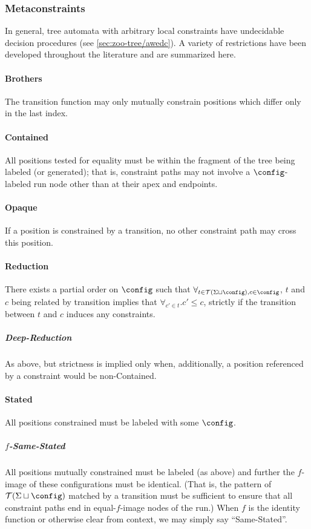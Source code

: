 \subsubsection{Metaconstraints}

In general, tree automata with arbitrary local constraints have undecidable
decision procedures (see \autoref{sec:zoo-tree/awedc}).  A variety of
restrictions have been developed throughout the literature and are
summarized here.

\paragraph{Brothers} The transition function may only mutually constrain
positions which differ only in the last index.

\paragraph{Contained} All positions tested for equality must be within the
fragment of the tree being labeled (or generated); that is, constraint paths
may not involve a $\config$-labeled run node other than at their apex and
endpoints.

\paragraph{Opaque} If a position is constrained by a transition, no other
constraint path may cross this position. 

\paragraph{Reduction} There exists a partial order on $\config$ such that
$\forall_{t \in \mathcal{T}(\Sigma \sqcup \config), c \in \config}$, $t$ and
$c$ being related by transition implies that $\forall_{c' \in t} . c' \le
c$, strictly if the transition between $t$ and $c$ induces any constraints.

\subparagraph{Deep-Reduction} As above, but strictness is implied only when,
additionally, a position referenced by a constraint would be non-Contained.

\paragraph{Stated} All positions constrained must be labeled with some 
$\config$.

\subparagraph{$f$-Same-Stated} All positions mutually constrained must be
labeled (as above) and further the $f$-image of these configurations must be
identical.  (That is, the pattern of $\mathcal{T}(\Sigma \sqcup \config)$
matched by a transition must be sufficient to ensure that all constraint
paths end in equal-$f$-image nodes of the run.)  When $f$ is the identity
function or otherwise clear from context, we may simply say ``Same-Stated''.

